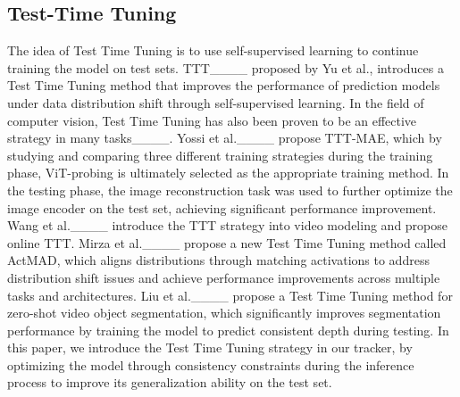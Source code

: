 \subsection{Test-Time Tuning} \label{subsec:ttt} 
The idea of Test Time Tuning is to use self-supervised learning to continue training the model on test sets. 
TTT____ proposed by Yu et al., introduces a Test Time Tuning method that improves the performance of prediction models under data distribution shift through self-supervised learning.
In the field of computer vision, Test Time Tuning has also been proven to be an effective strategy in many tasks____. 
Yossi et al.____ propose TTT-MAE, which by studying and comparing three different training strategies during the training phase, ViT-probing is ultimately selected as the appropriate training method. In the testing phase, the image reconstruction task was used to further optimize the image encoder on the test set, achieving significant performance improvement.
Wang et al.____ introduce the TTT strategy into video modeling and propose online TTT. 
Mirza et al.____ propose a new Test Time Tuning method called ActMAD, which aligns distributions through matching activations to address distribution shift issues and achieve performance improvements across multiple tasks and architectures.
Liu et al.____ propose a Test Time Tuning method for zero-shot video object segmentation, which significantly improves segmentation performance by training the model to predict consistent depth during testing.
In this paper, we introduce the Test Time Tuning strategy in our tracker, by optimizing the model through consistency constraints during the inference process to improve its generalization ability on the test set.


